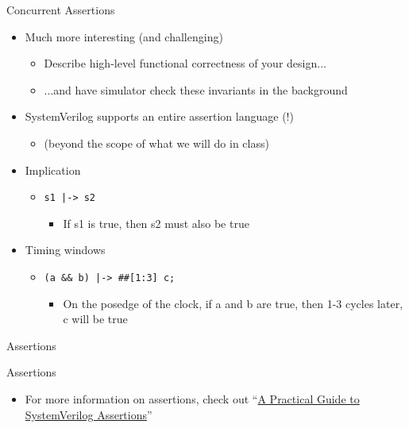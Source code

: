 \documentclass[table,dvipsnames]{beamer}
\begin{document}
 
    \begin{frame}{Concurrent Assertions}
	\begin{block}{}
		\begin{itemize}
			\item Much more interesting (and challenging)
			\begin{itemize}
				\item Describe high-level functional correctness of your design...
				\item ...and have simulator check these invariants in the background
			\end{itemize}
			\item SystemVerilog supports an entire assertion language (!)
			\begin{itemize}
				\item (beyond the scope of what we will do in class)
			\end{itemize}
			\item Implication 
			\begin{itemize}
				\item \color{ForestGreen} \texttt{s1 |-> s2}
				\begin{itemize}
					\item \color{Black} If s1 is true, then s2 must also be true
				\end{itemize}
			\end{itemize}
			\item Timing windows
			\begin{itemize}
				\item \color{ForestGreen} \texttt{(a \&\& b) |-> \#\#[1:3] c;}
				\begin{itemize} 
					\item \color{Black} On the posedge of the clock, if a and b are true, then 1-3 cycles later, c will be true
				\end{itemize}
			\end{itemize}

			
		\end{itemize}
	\end{block}
\end{frame}
 
 
    \begin{frame}{Assertions}
	\begin{block}{Assertions}
		\begin{itemize}
			\item For more information on assertions, check out ``\href{https://mirlyn.lib.umich.edu/Record/005702668}{A Practical Guide to SystemVerilog Assertions}''
		\end{itemize}
	\end{block}
\end{frame}
\end{document}
